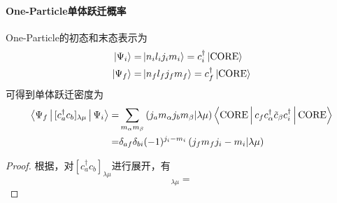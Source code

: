 \paragraph*{One-Particle单体跃迁概率}
One-Particle的初态和末态表示为
\begin{align}
    \ket{\Psi_i} =& \ket{n_i l_i j_i m_i} = c_{i}^{\dagger} \ket{\rm{CORE}} \\
    \ket{\Psi_f} =& \ket{n_f l_f j_f m_f} = c_{f}^{\dagger} \ket{\rm{CORE}}
\end{align}
可得到单体跃迁密度为
\begin{equation}
    \begin{aligned}
    \Braket{\Psi_f | [c_a^{\dagger} c_b]_{\lambda\mu} | \Psi_i}
    =&
    \sum_{m_\alpha m_\beta} \left(j_a m_\alpha j_b m_\beta | \lambda \mu\right)
    \Braket{\rm{CORE} | c_f c_\alpha^\dagger \tilde{c}_\beta c_i^\dagger | \rm{CORE}} \\
    =& \delta_{af}\delta_{bi} (-1)^{j_i - m_i} \left(j_f m_f j_i -m_i | \lambda \mu\right)        
    \end{aligned}
\end{equation}
\begin{proof}
    根据，对$[c_a^{\dagger} c_b]_{\lambda\mu}$进行展开，有
    \begin{equation}
        [c_a^{\dagger} c_b]_{\lambda\mu} = 
    \end{equation}
\end{proof}

